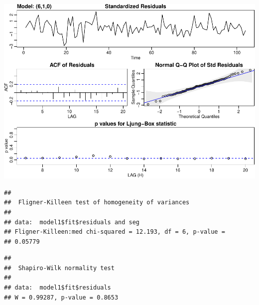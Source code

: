 \documentclass[]{article}
\newenvironment{Shaded}{\begin{snugshade}}{\end{snugshade}}
\newcommand{\DataTypeTok}[1]{\textcolor[rgb]{0.13,0.29,0.53}{#1}}
\newcommand{\DecValTok}[1]{\textcolor[rgb]{0.00,0.00,0.81}{#1}}
\newcommand{\KeywordTok}[1]{\textcolor[rgb]{0.13,0.29,0.53}{\textbf{#1}}}
\newcommand{\NormalTok}[1]{#1}
\newcommand{\OperatorTok}[1]{\textcolor[rgb]{0.81,0.36,0.00}{\textbf{#1}}}
\newcommand{\StringTok}[1]{\textcolor[rgb]{0.31,0.60,0.02}{#1}}
\begin{document}
\begin{center}\includegraphics{bookings_forecast_files/figure-latex/unnamed-chunk-9-1} \end{center}

\begin{Shaded}
\end{Shaded}

\begin{verbatim}
## 
##  Fligner-Killeen test of homogeneity of variances
## 
## data:  model1$fit$residuals and seg
## Fligner-Killeen:med chi-squared = 12.193, df = 6, p-value =
## 0.05779
\end{verbatim}

\begin{Shaded}
\end{Shaded}

\begin{verbatim}
## 
##  Shapiro-Wilk normality test
## 
## data:  model1$fit$residuals
## W = 0.99287, p-value = 0.8653
\end{verbatim}
\end{document}
